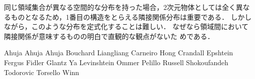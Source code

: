 同じ領域集合が異なる空間的な分布を持った場合，2次元物体としては全く異な
るものとなるため，1番目の構造をとらえる隣接関係分布は重要である．
しかしながら，このような分布を定式化することは難しい．
なぜなら領域間において隣接関係が意味するものの明白で直観的な観点がないた
めである．


Ahuja\cite{Ahuja_1982}
Ahuja\cite{Ahuja_1996}
Ahuja\cite{Ahuja_2007}
Bouchard\cite{Bouchard_2005}
Liangliang\cite{Liangliang_2007}
Carneiro\cite{Carneiro_2006}
Hong\cite{Hong_2006}
Crandall\cite{Crandall_2005}
Epshtein\cite{Epshtein_2007}
Fergus\cite{Fergus_2003}
Fidler\cite{Fidler_2007}
Glantz\cite{Glantz_2004}
Ya\cite{Ya_2006}
Levinshtein\cite{Levinshtein_2005}
Ommer\cite{Ommer_2007}
Pelillo\cite{Pelillo_1999}
Russell\cite{Russell_2006}
Shokoufandeh\cite{Shokoufandeh_2006}
Todorovic\cite{Todorovic_2006}
Torsello\cite{Torsello_2003}
Winn\cite{Winn_2005}
